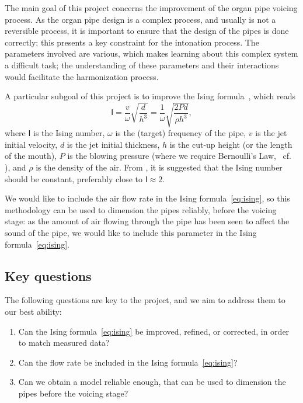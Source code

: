 \documentclass{psu-report}
\begin{document}
The main goal of this project concerns the improvement of the organ pipe voicing
process.
As the organ pipe design is a complex process, and usually is not a reversible
process, it is important to ensure that the design of the pipes is done
correctly; this presents a key constraint for the intonation process.
The parameters involved are various, which makes learning about this complex
system a difficult task; the understanding of these parameters and their
interactions would facilitate the harmonization process.

A particular subgoal of this project is to improve the Ising
formula~\autocite{1971Ising-1}, which reads
\begin{equation}
    \label{eq:ising}
    \mathsf{I}
    =
    \frac{v}{\omega}\sqrt{\frac{d}{h^3}}
    =
    \frac{1}{\omega}\sqrt{\frac{2 P d}{\rho h^3}},
\end{equation}
where \(\mathsf{I}\) is the Ising number, \(\omega\) is the (target) frequency
of the pipe, \(v\) is the jet initial velocity, \(d\) is the jet initial
thickness, \(h\) is the cut-up height (or the length of the mouth), \(P\) is the
blowing pressure (where we require Bernoulli's Law, ~cf. \autocite{2025Lilj-1}),
and \(\rho\) is the density of the air.
From \autocite{1971Ising-1, 2025Lilj-1}, it is suggested that the Ising number
should be constant, preferably close to \( \mathsf{I} \approx 2\).

We would like to include the air flow rate in the Ising formula~\ref{eq:ising},
so this methodology can be used to dimension the pipes reliably,
before the voicing stage: as the amount of air flowing through the pipe has been
seen to affect the sound of the pipe, we would like to include this parameter in
the Ising formula~\ref{eq:ising}.

\subsection{Key questions}

The following questions are key to the project, and we aim to address them to
our best ability:
\begin{enumerate}
    \item Can the Ising formula~\ref{eq:ising} be improved, refined, or
        corrected, in order to match measured data?
    \item Can the flow rate be included in the Ising formula~\ref{eq:ising}?
    \item Can we obtain a model reliable enough, that can be used to dimension the
        pipes before the voicing stage?
\end{enumerate}
\end{document}
